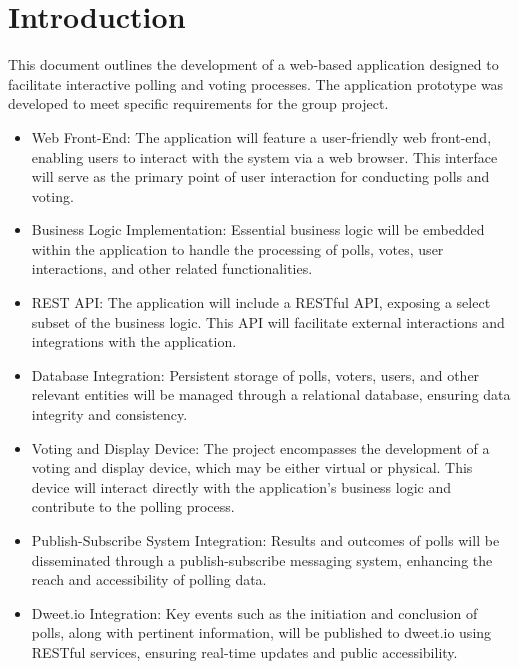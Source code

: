 \section{Introduction}
\label{sec:introduction}

This document outlines the development of a web-based application designed to facilitate interactive polling and voting processes. The application prototype was developed to meet specific requirements for the group project.

\begin{itemize}
\item Web Front-End: The application will feature a user-friendly web front-end, enabling users to interact with the system via a web browser. This interface will serve as the primary point of user interaction for conducting polls and voting.

\item Business Logic Implementation: Essential business logic will be embedded within the application to handle the processing of polls, votes, user interactions, and other related functionalities.

\item REST API: The application will include a RESTful API, exposing a select subset of the business logic. This API will facilitate external interactions and integrations with the application.

\item Database Integration: Persistent storage of polls, voters, users, and other relevant entities will be managed through a relational database, ensuring data integrity and consistency.

\item Voting and Display Device: The project encompasses the development of a voting and display device, which may be either virtual or physical. This device will interact directly with the application's business logic and contribute to the polling process.

\item Publish-Subscribe System Integration: Results and outcomes of polls will be disseminated through a publish-subscribe messaging system, enhancing the reach and accessibility of polling data.

\item Dweet.io Integration: Key events such as the initiation and conclusion of polls, along with pertinent information, will be published to dweet.io using RESTful services, ensuring real-time updates and public accessibility.


\end{itemize}
